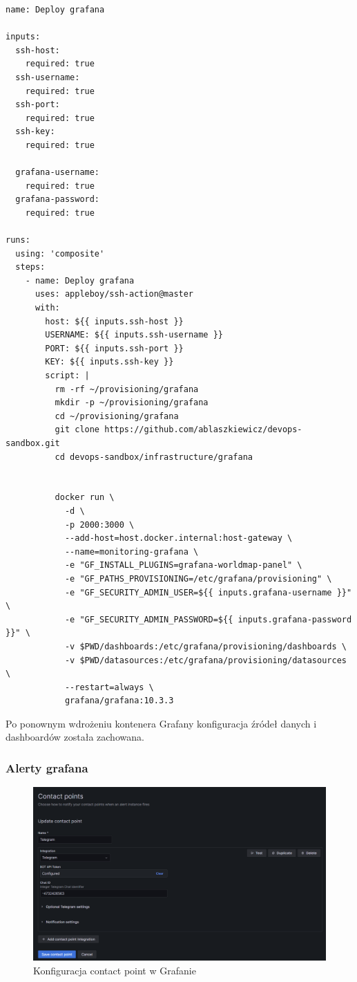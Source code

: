 \documentclass{article}
\begin{document}
\begin{lstlisting}[caption=Zmodyfikowany plik \texttt{.github/templates/deploy-grafana/action.yml}]
name: Deploy grafana

inputs:
  ssh-host:
    required: true
  ssh-username:
    required: true
  ssh-port:
    required: true
  ssh-key:
    required: true

  grafana-username:
    required: true
  grafana-password:
    required: true

runs:
  using: 'composite'
  steps:
    - name: Deploy grafana
      uses: appleboy/ssh-action@master
      with:
        host: ${{ inputs.ssh-host }}
        USERNAME: ${{ inputs.ssh-username }}
        PORT: ${{ inputs.ssh-port }}
        KEY: ${{ inputs.ssh-key }}
        script: |
          rm -rf ~/provisioning/grafana
          mkdir -p ~/provisioning/grafana
          cd ~/provisioning/grafana
          git clone https://github.com/ablaszkiewicz/devops-sandbox.git
          cd devops-sandbox/infrastructure/grafana


          docker run \
            -d \
            -p 2000:3000 \
            --add-host=host.docker.internal:host-gateway \
            --name=monitoring-grafana \
            -e "GF_INSTALL_PLUGINS=grafana-worldmap-panel" \
            -e "GF_PATHS_PROVISIONING=/etc/grafana/provisioning" \
            -e "GF_SECURITY_ADMIN_USER=${{ inputs.grafana-username }}" \
            -e "GF_SECURITY_ADMIN_PASSWORD=${{ inputs.grafana-password }}" \
            -v $PWD/dashboards:/etc/grafana/provisioning/dashboards \
            -v $PWD/datasources:/etc/grafana/provisioning/datasources \
            --restart=always \
            grafana/grafana:10.3.3
\end{lstlisting}

Po ponownym wdrożeniu kontenera Grafany konfiguracja źródeł danych i dashboardów została zachowana.

\subsubsection{Alerty grafana}

\begin{figure}[H]
    \centering
    \includegraphics[width=1\linewidth]{konfiguracjaContactPointGrafana.png}
    \caption{Konfiguracja contact point w Grafanie}
    \label{fig:enter-label}
\end{figure}
\end{document}
